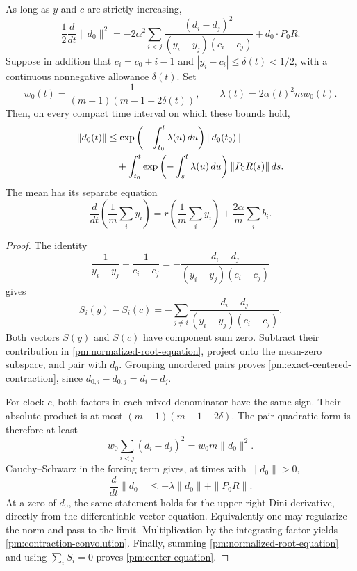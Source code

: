 \begin{theorem}
\label{pm:centered-contraction}
As long as \(y\) and \(c\) are strictly increasing,
\begin{equation}
 \frac12\frac{d}{dt}\|d_0\|^2
 =-2\alpha^2\sum_{i<j}
       \frac{(d_i-d_j)^2}{(y_i-y_j)(c_i-c_j)}
   +d_0\mathbin{\cdot}P_0R.
 \label{pm:exact-centered-contraction}
\end{equation}
Suppose in addition that \(c_i=c_0+i-1\) and
\(|y_i-c_i|\le\delta(t)<1/2\), with a continuous nonnegative
allowance \(\delta(t)\).  Set
\begin{equation}
 w_0(t)=\frac1{(m-1)(m-1+2\delta(t))},\qquad
 \lambda(t)=2\alpha(t)^2m w_0(t).
 \label{pm:contraction-rate}
\end{equation}
Then, on every compact time interval on which these bounds hold,
\begin{align}
 \|d_0(t)\|
 &\le \exp\left(-\int_{t_0}^t\lambda(u)\,du\right)
             \|d_0(t_0)\|\notag\\
 &\quad+\int_{t_0}^t
     \exp\left(-\int_s^t\lambda(u)\,du\right)
             \|P_0R(s)\|\,ds.
 \label{pm:contraction-convolution}
\end{align}
The mean has its separate equation
\begin{equation}
 \frac{d}{dt}\left(\frac1m\sum_i y_i\right)
  =r\left(\frac1m\sum_i y_i\right)
     +\frac{2\alpha}{m}\sum_i b_i.
 \label{pm:center-equation}
\end{equation}
\end{theorem}

\begin{proof}
The identity
\[
 \frac1{y_i-y_j}-\frac1{c_i-c_j}
  =-\frac{d_i-d_j}{(y_i-y_j)(c_i-c_j)}
\]
gives
\[
 S_i(y)-S_i(c)
 =-\sum_{j\ne i}
       \frac{d_i-d_j}{(y_i-y_j)(c_i-c_j)}.
\]
Both vectors \(S(y)\) and \(S(c)\) have component sum zero.
Subtract their contribution in \eqref{pm:normalized-root-equation},
project onto the mean-zero subspace, and pair with \(d_0\).  Grouping
unordered pairs proves \eqref{pm:exact-centered-contraction}, since
\(d_{0,i}-d_{0,j}=d_i-d_j\).

For clock \(c\), both factors in each mixed denominator have the same
sign.  Their absolute product is at most
\((m-1)(m-1+2\delta)\).  The pair quadratic form is therefore at
least
\[
 w_0\sum_{i<j}(d_i-d_j)^2=w_0m\|d_0\|^2.
\]
Cauchy--Schwarz in the forcing term gives, at times with
\(\|d_0\|>0\),
\[
 \frac{d}{dt}\|d_0\|
 \le-\lambda\|d_0\|+\|P_0R\|.
\]
At a zero of \(d_0\), the same statement holds for the upper right
Dini derivative, directly from the differentiable vector equation.
Equivalently one may regularize the norm and pass to the limit.
Multiplication by the integrating factor yields
\eqref{pm:contraction-convolution}.  Finally, summing
\eqref{pm:normalized-root-equation} and using \(\sum_iS_i=0\)
proves \eqref{pm:center-equation}.
\end{proof}

